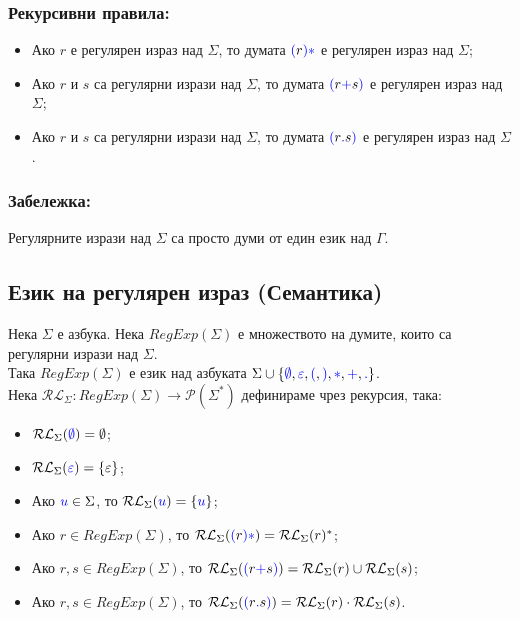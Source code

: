 \documentclass[12pt]{article}
\begin{document}
\subsubsection{Рекурсивни правила:}
\begin{itemize}
    \item Ако \(r\) е регулярен израз над \(\Sigma\), то думата \(\textcolor{blue}{(}r\textcolor{blue}{)*}\) е регулярен израз над \(\Sigma\);
    \item Ако \(r\) и \(s\) са регулярни изрази над \(\Sigma\), то думата  \(\textcolor{blue}{(}r\textcolor{blue}{+}s\textcolor{blue}{)}\) е регулярен израз над \(\Sigma\);
    \item Ако \(r\) и \(s\) са регулярни изрази над \(\Sigma\), то думата
    \(\textcolor{blue}{(}r\textcolor{blue}{\Large{.}}s\textcolor{blue}{)}\)  е регулярен израз над \(\Sigma\).
\end{itemize}

\subsubsection{Забележка:}
Регулярните изрази над \(\Sigma\) са просто думи от един език над \(\Gamma\).

\subsection{Език на регулярен израз (Семантика)}
Нека \(\Sigma\) е азбука.
Нека \(RegExp(\Sigma)\) е множеството на думите, които са регулярни изрази над \(\Sigma\). \\
Така \(RegExp(\Sigma)\) е език над азбуката \(\Sigma \cup \{\textcolor{blue}{\emptyset}, \textcolor{blue}{\varepsilon}, \textcolor{blue}{(}, \textcolor{blue}{)}, \textcolor{blue}{*}, \textcolor{blue}{+}, \textcolor{blue}{\Large{.}}\}\). \\
Нека \(\mathcal{RL}_\Sigma : RegExp(\Sigma) \to \mathcal{P}(\Sigma^*)\) дефинираме чрез рекурсия, така:

\begin{itemize}
    \item \(\mathcal{RL}_\Sigma(\textcolor{blue}{\emptyset}) = \emptyset\);
    \item \(\mathcal{RL}_\Sigma(\textcolor{blue}{\varepsilon}) = \{\varepsilon\}\);
    \item Ако \(\textcolor{blue}{u} \in \Sigma\), то \(\mathcal{RL}_\Sigma(\textcolor{blue}{u}) = \{\textcolor{blue}{u}\}\);
    \item Ако \(r \in RegExp(\Sigma)\), то \(\mathcal{RL}_\Sigma(\textcolor{blue}{(}r\textcolor{blue}{)*}) = \mathcal{RL}_\Sigma(r)^*\);
    \item Ако \(r, s \in RegExp(\Sigma)\), то \(\mathcal{RL}_\Sigma(\textcolor{blue}{(}r \textcolor{blue}{+} s \textcolor{blue}{)}) = \mathcal{RL}_\Sigma(r) \cup \mathcal{RL}_\Sigma(s)\);
    \item Ако \(r, s \in RegExp(\Sigma)\), то \(\mathcal{RL}_\Sigma(\textcolor{blue}{(}r \textcolor{blue}{\Large{.}} s \textcolor{blue}{)}) = \mathcal{RL}_\Sigma(r) \cdot \mathcal{RL}_\Sigma(s)\).
\end{itemize}
\end{document}

